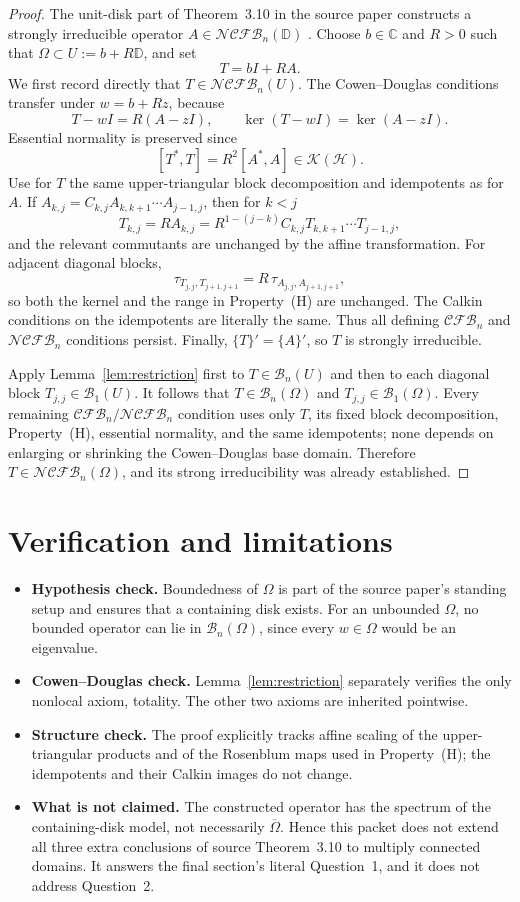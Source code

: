 \documentclass[11pt]{article}
\newcommand{\Bclass}{\mathcal B}
\newcommand{\NCFB}{\mathcal{NCFB}}
\newcommand{\CFB}{\mathcal{CFB}}
\newcommand{\D}{\mathbb D}
\newcommand{\K}{\mathcal K}
\begin{document}
\begin{proof}
The unit-disk part of Theorem~3.10 in the source paper constructs a strongly
irreducible operator $A\in\NCFB_n(\D)$ \cite{JJW}.  Choose $b\in\mathbb C$ and $R>0$ such that
$\Omega\subset U:=b+R\D$, and set
\[
 T=bI+RA.
\]
We first record directly that $T\in\NCFB_n(U)$.  The Cowen--Douglas
conditions transfer under $w=b+Rz$, because
\[
 T-wI=R(A-zI),\qquad \ker(T-wI)=\ker(A-zI).
\]
Essential normality is preserved since
\[
 [T^*,T]=R^2[A^*,A]\in\K(\mathcal H).
\]
Use for $T$ the same upper-triangular block decomposition and idempotents as
for $A$.  If $A_{k,j}=C_{k,j}A_{k,k+1}\cdots A_{j-1,j}$, then for $k<j$
\[
 T_{k,j}=RA_{k,j}
 =R^{1-(j-k)}C_{k,j}T_{k,k+1}\cdots T_{j-1,j},
\]
and the relevant commutants are unchanged by the affine transformation.  For
adjacent diagonal blocks,
\[
 \tau_{T_{j,j},T_{j+1,j+1}}
 =R\,\tau_{A_{j,j},A_{j+1,j+1}},
\]
so both the kernel and the range in Property~(H) are unchanged.  The Calkin
conditions on the idempotents are literally the same.  Thus all defining
$\CFB_n$ and $\NCFB_n$ conditions persist.  Finally,
$\{T\}'=\{A\}'$, so $T$ is strongly irreducible.

Apply Lemma~\ref{lem:restriction} first to $T\in\Bclass_n(U)$ and then to
each diagonal block $T_{j,j}\in\Bclass_1(U)$.  It follows that
$T\in\Bclass_n(\Omega)$ and $T_{j,j}\in\Bclass_1(\Omega)$.  Every remaining
$\CFB_n/\NCFB_n$ condition uses only $T$, its fixed block decomposition,
Property~(H), essential normality, and the same idempotents; none depends on
enlarging or shrinking the Cowen--Douglas base domain.  Therefore
$T\in\NCFB_n(\Omega)$, and its strong irreducibility was already established.
\end{proof}

\section{Verification and limitations}

\begin{itemize}[leftmargin=*]
\item \textbf{Hypothesis check.}  Boundedness of $\Omega$ is part of the
source paper's standing setup and ensures that a containing disk exists.
For an unbounded $\Omega$, no bounded operator can lie in $\Bclass_n(\Omega)$,
since every $w\in\Omega$ would be an eigenvalue.
\item \textbf{Cowen--Douglas check.}  Lemma~\ref{lem:restriction} separately
verifies the only nonlocal axiom, totality.  The other two axioms are inherited
pointwise.
\item \textbf{Structure check.}  The proof explicitly tracks affine scaling
of the upper-triangular products and of the Rosenblum maps used in
Property~(H); the idempotents and their Calkin images do not change.
\item \textbf{What is not claimed.}  The constructed operator has the
spectrum of the containing-disk model, not necessarily
$\overline\Omega$.  Hence this packet does not extend all three extra
conclusions of source Theorem~3.10 to multiply connected domains.  It answers
the final section's literal Question~1, and it does not address Question~2.
\end{itemize}
\end{document}

